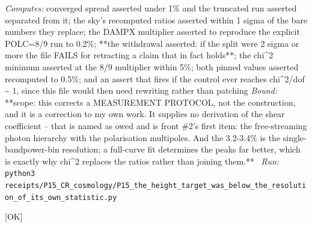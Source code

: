 \begin{description}
\emph{Computes:} converged spread asserted under 1\% and the truncated run asserted separated from it; the sky's recomputed ratios asserted within 1 sigma of the bare numbers they replace; the DAMPX multiplier asserted to reproduce the explicit POLC=8/9 run to 0.2\%; **the withdrawal asserted: if the split were 2 sigma or more the file FAILS for retracting a claim that in fact holds**; the chi\textasciicircum{}2 minimum asserted at the 8/9 multiplier within 5\%; both pinned values asserted recomputed to 0.5\%; and an assert that fires if the control ever reaches chi\textasciicircum{}2/dof \textasciitilde{} 1, since this file would then need rewriting rather than patching
 \emph{Bound:} **scope: this corrects a MEASUREMENT PROTOCOL, not the construction, and it is a correction to my own work. It supplies no derivation of the shear coefficient -- that is named as owed and is front \#2's first item: the free-streaming photon hierarchy with the polarisation multipoles. And the 3.2-3.4\% is the single-bandpower-bin resolution; a full-curve fit determines the peaks far better, which is exactly why chi\textasciicircum{}2 replaces the ratios rather than joining them.**
\ \emph{Run:} \texttt{python3 receipts/P15\_CR\_cosmology/P15\_the\_height\_target\_was\_below\_the\_resolution\_of\_its\_own\_statistic.py}
\item[\rcptlabel{P15_the_shear_coefficient_derived_not_remembered}{P15R71}\textbf{P15R71}\quad\texttt{P15\_the\_shear\_coefficient\_derived\_not\_remembered}]\hfill\textsf{[OK]}\\

\end{description}

